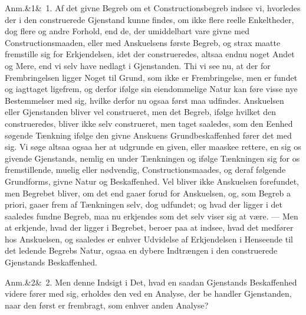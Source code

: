 \documentclass[12pt]{book}
\def\sperr#1{#1}%
\def\textit#1{#1}%
\newcommand{\sperr}[1]{\textls[180]{#1}}
\newcommand{\anm}[1]{%
  \par\vspace{0.5\baselineskip}%
  \noindent\hspace{\parindent}\sperr{Anm.}\ifx&#1&\else~\textit{#1}.\fi
  \enspace\ignorespaces
}
\newcommand{\opage}[1]{\marginnote{\footnotesize\textit{[#1]}}}
\begin{document}
\anm{1} Af det givne Begreb om et Constructionsbegreb indsee vi, hvorledes der i den
construerede Gjenstand kunne findes, om ikke flere reelle Enkeltheder, dog flere og
andre Forhold, end de, der umiddelbart vare givne med Constructionsmaaden, eller med
Anskuelsens første Begreb, og strax maatte fremstille sig for Erkjendelsen, idet der
construeredes, altsaa endnu noget Andet og Mere, end vi selv have nedlagt i
Gjenstanden. Thi vi see nu, at der for Frembringelsen ligger Noget til Grund, som ikke
er
\opage{165} Frembringelse, men er fundet og iagttaget ligefrem, og derfor ifølge sin eiendommelige
Natur kan føre visse nye Bestemmelser med sig, hvilke derfor nu ogsaa først maa
udfindes. Anskuelsen eller Gjenstanden bliver vel construeret, men det Begreb, ifølge
hvilket den construeredes, bliver ikke selv construeret, men taget saaledes, som den
Eenhed søgende Tænkning ifølge den givne Anskuens Grundbeskaffenhed fører det med sig.
Vi søge altsaa ogsaa her at udgrunde en given, eller maaskee rettere, en sig os givende
Gjenstands, nemlig en under Tænkningen og ifølge Tænkningen sig for os fremstillende,
muelig eller nødvendig, Constructionsmaades, og deraf følgende Grundforms, givne Natur
og Beskaffenhed. Vel bliver ikke Anskuelsen forefundet, men Begrebet bliver, om det end
gaaer forud for Anskuelsen, og, som Begreb \textit{a priori}, gaaer frem af Tænkningen
selv, dog udfundet; og hvad der ligger i det saaledes fundne Begreb, maa nu erkjendes
som det selv viser sig at være. --- Men at erkjende, hvad der ligger i Begrebet, beroer
paa at indsee, hvad det medfører hos Anskuelsen, og saaledes er enhver Udvidelse af
Erkjendelsen i Henseende til det ledende Begrebs Natur, ogsaa en dybere Indtrængen i
den construerede Gjenstands Beskaffenhed.

\anm{2} Men denne Indsigt i Det, hvad en saadan Gjenstands Beskaffenhed videre fører
med sig, erholdes den ved en Analyse, der be%
\opage{166}handler Gjenstanden, naar den først er frembragt, som enhver anden Analyse?
\end{document}
